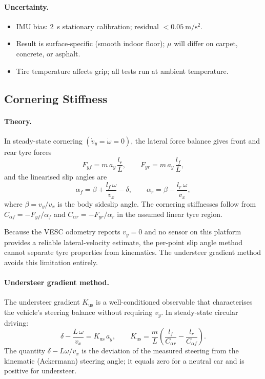 \documentclass[11pt,a4paper]{article}
\begin{document}
\paragraph{Uncertainty.}
\begin{itemize}
  \item IMU bias: \SI{2}{\second} stationary calibration; residual
        $< \SI{0.05}{\metre\per\second\squared}$.
  \item Result is surface-specific (smooth indoor floor); $\mu$ will
        differ on carpet, concrete, or asphalt.
  \item Tire temperature affects grip; all tests run at ambient temperature.
\end{itemize}

\subsection{Cornering Stiffness}\label{sec:cornering}

\paragraph{Theory.}
In steady-state cornering $(\dot{v}_y = \dot{\omega} = 0)$, the lateral
force balance gives front and rear tyre forces
\begin{equation}\label{eq:Fy-ss}
  F_{yf} = m\,a_y\,\frac{l_r}{L}, \qquad
  F_{yr} = m\,a_y\,\frac{l_f}{L},
\end{equation}
and the linearised slip angles are
\begin{equation}\label{eq:alpha-ss}
  \alpha_f = \beta + \frac{l_f\,\omega}{v_x} - \delta, \qquad
  \alpha_r = \beta - \frac{l_r\,\omega}{v_x},
\end{equation}
where $\beta = v_y / v_x$ is the body sideslip angle.  The cornering
stiffnesses follow from $C_{\alpha f} = -F_{yf}/\alpha_f$ and
$C_{\alpha r} = -F_{yr}/\alpha_r$ in the assumed linear tyre region.

Because the VESC odometry reports $v_y = 0$ and no sensor on this platform
provides a reliable lateral-velocity estimate, the per-point slip angle
method cannot separate tyre properties from kinematics.
The understeer gradient method avoids this limitation entirely.

\paragraph{Understeer gradient method.}
The understeer gradient $K_\text{us}$ is a well-conditioned observable
that characterises the vehicle's steering balance without requiring
$v_y$.  In steady-state circular driving:
\begin{equation}\label{eq:Kus}
  \delta - \frac{L\,\omega}{v_x} = K_\text{us}\,a_y,
  \qquad
  K_\text{us} = \frac{m}{L}
    \!\left(\frac{l_f}{C_{\alpha r}} - \frac{l_r}{C_{\alpha f}}\right).
\end{equation}
The quantity $\delta - L\omega/v_x$ is the deviation of the measured
steering from the kinematic (Ackermann) steering angle; it equals zero
for a neutral car and is positive for understeer.
\end{document}
